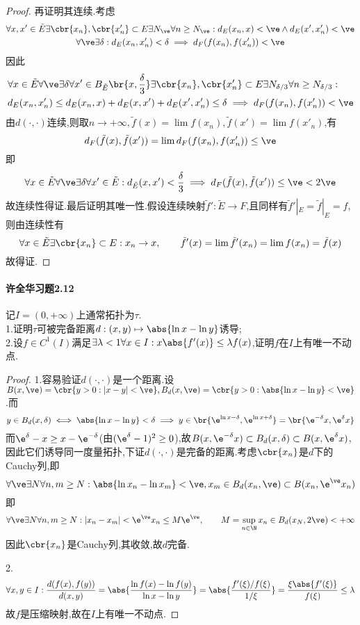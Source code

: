 \documentclass{article}
\begin{document}
\begin{proof}
    再证明其连续.考虑$$\begin{gathered}
        \forall x,x'\in \tilde{E}\exists \cbr{x_n},\cbr{x'_n}\subset E\exists N_\ve\forall n\geq N_\ve:d_E(x_n,x)<\ve\land d_E(x',x'_n)<\ve\\
        \forall \ve \exists \delta:d_E(x_n,x'_n)<\delta\implies d_F(f(x_n),f(x'_n))<\ve
    \end{gathered}$$
    因此
    $$\begin{aligned}
        &\forall x\in \tilde{E}\forall \ve\exists \delta\forall x'\in B_{\tilde{E}}\br{x,\frac{\delta}{3}}\exists\cbr{x_n},\cbr{x'_n}\subset E\exists N_{\delta/3}\forall n\geq N_{\delta/3}:\\
        &d_E(x_n,x'_n)\leq d_E(x_n,x)+d_E(x,x')+d_E(x',x'_n)\leq \delta\implies d_F(f(x_n),f(x'_n))<\ve
    \end{aligned}$$
    由$d(\cdot,\cdot)$连续,则取$n\to +\infty, \tilde{f}(x)=\lim f(x_n), \tilde{f}(x')=\lim f(x'_n)$,有$$d_F(\tilde{f}(x),\tilde{f}(x'))=\lim d_F(f(x_n),f(x'_n))\leq \ve$$
    即$$\forall x\in \tilde{E}\forall\ve \exists \delta\forall x'\in \tilde{E}:d_{\tilde{E}}(x,x')<\frac{\delta}{3}\implies d_F(\tilde{f}(x),\tilde{f}(x'))\leq \ve<2\ve$$
    故连续性得证.最后证明其唯一性.假设连续映射$\tilde{f}':\tilde{E}\to F$,且同样有$\tilde{f}'|_E=\tilde{f}|_E=f$,则由连续性有
    $$\forall x\in\tilde{E}\exists \cbr{x_n}\subset E:x_n\to x,\qquad \tilde{f}'(x)=\lim \tilde{f}'(x_n)=\lim f(x_n)=\tilde{f}(x)$$
    故得证.
\end{proof}

\paragraph{许全华习题2.12}记$I=(0,+\infty)$上通常拓扑为$\tau$.\\ 1.证明$\tau$可被完备距离$d:(x,y)\mapsto \abs{\ln x-\ln y}$诱导;\\
2.设$f\in C^1(I)$满足$\exists \lambda<1\forall x\in I:x\abs{f'(x)}\leq \lambda f(x)$,证明$f$在$I$上有唯一不动点.
\begin{proof}
    1.容易验证$d(\cdot,\cdot)$是一个距离.设$B(x,\ve)=\cbr{y>0:|x-y|<\ve},B_d(x,\ve)=\cbr{y>0:\abs{\ln x-\ln y}<\ve}$.而$$y\in B_d(x,\delta)\iff \abs{\ln x-\ln y}<\delta\implies y\in \br{\e^{\ln x-\delta},\e^{\ln x+\delta}}=\br{\e^{-\delta}x,\e^\delta x}$$
    而$\e^\delta-x\geq x-\e^{-\delta}$(由$(\e^\delta-1)^2\geq 0$),故$B(x,\e^{-\delta} x)\subset B_d(x,\delta)\subset B(x,\e^\delta x)$,因此它们诱导同一度量拓扑,下证$d(\cdot,\cdot)$是完备的距离.考虑$\cbr{x_n}$是$d$下的Cauchy列,即$$\forall \ve\exists N\forall n,m\geq N:\abs{\ln x_n-\ln x_m}<\ve,x_m\in B_d(x_n,\ve)\subset B(x_n,\e^\ve x_n)$$
    即$$\forall \ve\exists N\forall n,m\geq N:|x_n-x_m|<\e^\ve x_n\leq M\e^\ve,\qquad M=\sup_{n\in \N}x_n\in B_d(x_N,2\ve)<+\infty$$
    因此$\cbr{x_n}$是Cauchy列,其收敛,故$d$完备.

    2.$$\forall x,y\in I:\frac{d(f(x),f(y))}{d(x,y)}=\abs{\frac{\ln f(x)-\ln f(y)}{\ln x-\ln y}}=\abs{\frac{f'(\xi)/f(\xi)}{1/\xi}}=\frac{\xi\abs{f'(\xi)}}{f(\xi)}\leq \lambda$$
    故$f$是压缩映射,故在$I$上有唯一不动点.
\end{proof}
\end{document}
